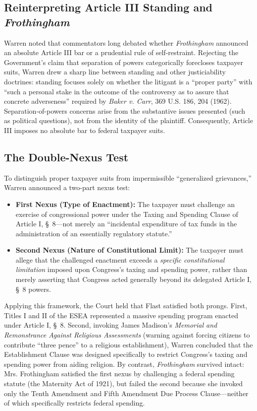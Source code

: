 \documentclass[12pt]{article}
\begin{document}
\subsection{Reinterpreting Article III Standing and \textit{Frothingham}}
Warren noted that commentators long debated whether \textit{Frothingham} announced an absolute Article III bar or a prudential rule of self-restraint. Rejecting the Government's claim that separation of powers categorically forecloses taxpayer suits, Warren drew a sharp line between standing and other justiciability doctrines: standing focuses solely on whether the litigant is a ``proper party'' with ``such a personal stake in the outcome of the controversy as to assure that concrete adverseness'' required by \textit{Baker v. Carr}, 369 U.S. 186, 204 (1962). Separation-of-powers concerns arise from the substantive issues presented (such as political questions), not from the identity of the plaintiff. Consequently, Article III imposes no absolute bar to federal taxpayer suits.

\subsection{The Double-Nexus Test}
To distinguish proper taxpayer suits from impermissible ``generalized grievances,'' Warren announced a two-part nexus test:
\begin{itemize}
  \item \textbf{First Nexus (Type of Enactment):} The taxpayer must challenge an exercise of congressional power under the Taxing and Spending Clause of Article I, \S\ 8---not merely an ``incidental expenditure of tax funds in the administration of an essentially regulatory statute.''
  \item \textbf{Second Nexus (Nature of Constitutional Limit):} The taxpayer must allege that the challenged enactment exceeds a \textit{specific constitutional limitation} imposed upon Congress's taxing and spending power, rather than merely asserting that Congress acted generally beyond its delegated Article I, \S\ 8 powers.
\end{itemize}

Applying this framework, the Court held that Flast satisfied both prongs. First, Titles I and II of the ESEA represented a massive spending program enacted under Article I, \S\ 8. Second, invoking James Madison's \textit{Memorial and Remonstrance Against Religious Assessments} (warning against forcing citizens to contribute ``three pence'' to a religious establishment), Warren concluded that the Establishment Clause was designed specifically to restrict Congress's taxing and spending power from aiding religion. By contrast, \textit{Frothingham} survived intact: Mrs. Frothingham satisfied the first nexus by challenging a federal spending statute (the Maternity Act of 1921), but failed the second because she invoked only the Tenth Amendment and Fifth Amendment Due Process Clause---neither of which specifically restricts federal spending.
\end{document}
